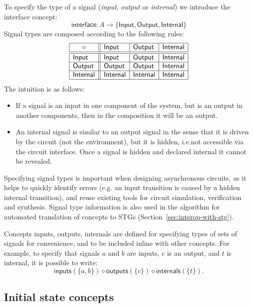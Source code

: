 \documentclass[british, journal]{IEEEtran}
\begin{document}
To specify the type of a signal (\emph{input},
\emph{output} or \emph{internal}) we introduce the \textsf{interface} concept:
\[
\mathsf{interface} : A \rightarrow \{\mathsf{Input}, \mathsf{Output},
\mathsf{Internal}\}
\]
Signal types are composed according to the following rules:
\[
\begin{array}{|l||l|l|l|}
\hline
\multicolumn{1}{|c||}{\diamond} & \mathsf{Input} & \mathsf{Output} &
\mathsf{Internal} \\ \hline \hline
\mathsf{Input} & \mathsf{Input} & \mathsf{Output} & \mathsf{Internal} \\ \hline
\mathsf{Output} & \mathsf{Output} & \mathsf{Output} & \mathsf{Internal} \\
\hline
\mathsf{Internal}& \mathsf{Internal} & \mathsf{Internal} & \mathsf{Internal} \\
\hline
\end{array}
\]
The intuition is as follows:
\begin{itemize}
    \item If a signal is an input in one component of the system, but is an
    output in another components, then in the composition it will be an output.
    \item An internal signal is similar to an output signal in the sense
that it is driven by the circuit (not the environment), but it is hidden, i.e.not accessible via the circuit interface. Once a signal is hidden and declared    internal it cannot be revealed.
\end{itemize}

\noindent Specifying signal types is important when designing asynchronous
circuits, as it helps to quickly identify errors (e.g. an input transition is
caused by a hidden internal transition), and reuse existing tools for circuit
simulation, verification and synthesis. Signal type information is also used
in the algorithm for automated translation of concepts to
STGs (Section~\ref{sec:interop-with-stg}).

Concepts \textsf{inputs}, \textsf{outputs}, \textsf{internals} are defined for
specifying types of sets of signals for convenience, and to be included inline with other
concepts. For example, to specify
that signals $a$ and $b$ are inputs, $c$ is an output, and $t$ is internal, it
is possible to write:
\[
\mathsf{inputs}(\{a, b\}) \diamond \mathsf{outputs}(\{c\}) \diamond
\mathsf{internals}(\{t\}).
\]

\subsection{Initial state concepts \label{sub:initState}}
\end{document}
